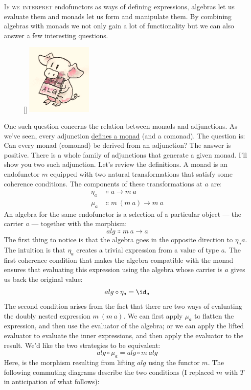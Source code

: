 \lettrine[lhang=0.17]{I}{f we interpret} endofunctors as ways of defining expressions, algebras
let us evaluate them and monads let us form and manipulate them. By
combining algebras with monads we not only gain a lot of functionality
but we can also answer a few interesting questions.
\begin{figure}
\raisebox{0pt}[\dimexpr{}\baselineskip\relax]{
\includegraphics[width=1.27083in]{images/pigalg.png}}%
\end{figure}

One such question
concerns the relation between monads and adjunctions. As we've seen,
every adjunction \hyperref[monads-categorically]{defines
a monad} (and a comonad). The question is: Can every monad (comonad) be
derived from an adjunction? The answer is positive. There is a whole
family of adjunctions that generate a given monad. I'll show you two
such adjunction.
Let's review the definitions. A monad is an endofunctor $m$
equipped with two natural transformations that satisfy some coherence
conditions. The components of these transformations at $a$ are:
\begin{align*}
\eta_a &\Colon a \to m\ a \\
\mu_a &\Colon m\ (m\ a) \to m\ a
\end{align*}
An algebra for the same endofunctor is a selection of a particular
object --- the carrier $a$ --- together with the morphism:
\[alg \Colon m\ a \to a\]
The first thing to notice is that the algebra goes in the opposite
direction to $\eta_aa$. The intuition is that $\eta_a$ creates a
trivial expression from a value of type $a$. The first coherence
condition that makes the algebra compatible with the monad ensures that
evaluating this expression using the algebra whose carrier is $a$
gives us back the original value:
\[alg \circ \eta_a = \id_a\]
The second condition arises from the fact that there are two ways of
evaluating the doubly nested expression $m\ (m\ a)$. We can first
apply $\mu_a$ to flatten the expression, and then use the evaluator
of the algebra; or we can apply the lifted evaluator to evaluate the
inner expressions, and then apply the evaluator to the result. We'd like
the two strategies to be equivalent:
\[alg \circ \mu_a = alg \circ m\ alg\]
Here,  is the morphism resulting from lifting
$alg$ using the functor $m$. The following commuting
diagrams describe the two conditions (I replaced $m$ with
$T$ in anticipation of what follows):

